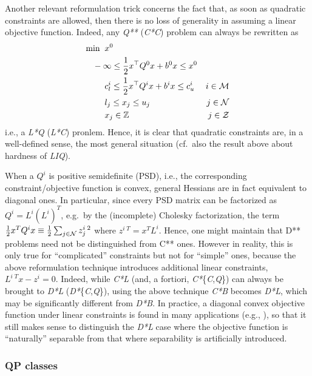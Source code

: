 Another relevant reformulation trick concerns the fact that, as soon as quadratic constraints are allowed, then there is no loss of generality in assuming a linear objective function. Indeed, any \textit{Q**} (\textit{C*C}) problem can always be rewritten as
%
\begin{align*}
 \min \;\;
 & x^0 \\
 & \hspace*{-5mm} -\infty \leq \half x^\top Q^0 x + b^0 x \leq x^0 & \\
 & c^i_l \leq \half x^\top Q^i x + b^i x \leq c^i_u & i \in \Mcm \\
 & l_j \leq x_j \leq u_j & j \in \Mcn  \\
 & x_j \in \mathbb{Z} & j \in \Mcz
\end{align*}
%
i.e., a \textit{L*Q} (\textit{L*C}) pronlem. Hence, it is clear that quadratic constraints are, in a well-defined sense, the most general situation (cf.~also the result above about hardness of \textit{LIQ}).

When a $Q^i$ is positive semidefinite (PSD), i.e., the corresponding constraint/objective function is convex, general Hessians are in fact equivalent to diagonal ones. In particular, since every PSD matrix can be factorized as $Q^i = L^i (L^i)^T$, e.g.~by the (incomplete) Cholesky factorization, the term $\frac{1}{2} x^T Q^i x \equiv \frac{1}{2} \sum_{j \in \mathcal{N}} z^{i\;2}_j$ where $z^{i\;T} = x^T L^i$. Hence, one might maintain that D** problems need not be distinguished from C** ones. However in reality, this is only true for ``complicated'' constraints but not for ``simple'' ones, because the above reformulation technique introduces additional linear constraints, $L^{i\;T} x - z^i = 0$. Indeed, while \textit{C*L} (and, a fortiori, \textit{C*}\{\textit{C},\textit{Q}\}) can always be brought to \textit{D*L} (\textit{D*}\{\textit{C},\textit{Q}\}), using the above technique \textit{C*B} becomes \textit{D*L}, which may be significantly different from \textit{D*B}. In practice, a diagonal convex objective function under linear constraints is found in many applications (e.g., \cite{FrFG16,FrGe06a,FrGe09a,FGGP11}), so that it still makes sense to distinguish the \textit{D*L} case where the objective function is ``naturally'' separable from that where separability is artificially introduced.

\subsubsection{QP classes}\label{ssec:classes}

